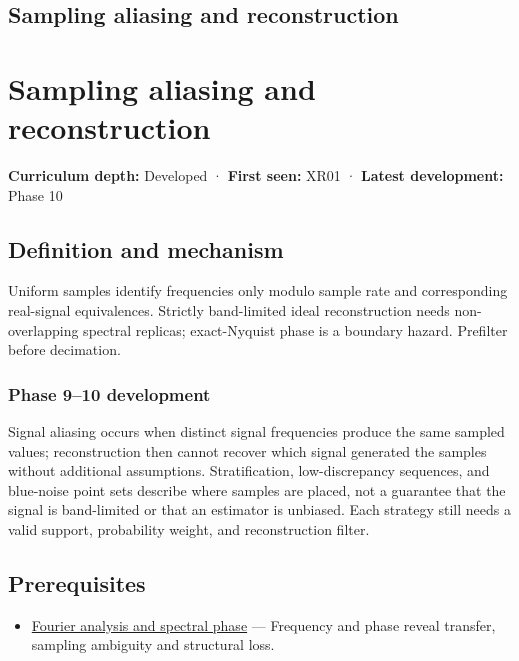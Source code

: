 \hypertarget{appendix-6a7869dd79a6}{}
\section*{Sampling aliasing and reconstruction}
\chapter{Sampling aliasing and reconstruction}\label{appendix-6a7869dd79a6-sampling-aliasing-and-reconstruction}

\textbf{Curriculum depth:} Developed · \textbf{First seen:} XR01 · \textbf{Latest development:} Phase 10

\section{Definition and mechanism}\label{appendix-6a7869dd79a6-definition-and-mechanism}

Uniform samples identify frequencies only modulo sample rate and corresponding real-signal equivalences. Strictly band-limited ideal reconstruction needs non-overlapping spectral replicas; exact-Nyquist phase is a boundary hazard. Prefilter before decimation.

\subsection{Phase 9--10 development}\label{appendix-6a7869dd79a6-phase-910-development}

Signal aliasing occurs when distinct signal frequencies produce the same sampled values; reconstruction then cannot recover which signal generated the samples without additional assumptions. Stratification, low-discrepancy sequences, and blue-noise point sets describe where samples are placed, not a guarantee that the signal is band-limited or that an estimator is unbiased. Each strategy still needs a valid support, probability weight, and reconstruction filter.

\section{Prerequisites}\label{appendix-6a7869dd79a6-prerequisites}

\begin{itemize}
\tightlist
\item
  \hyperref[appendix-b60686ba06a1]{Fourier analysis and spectral phase} --- Frequency and phase reveal transfer, sampling ambiguity and structural loss.
\end{itemize}

